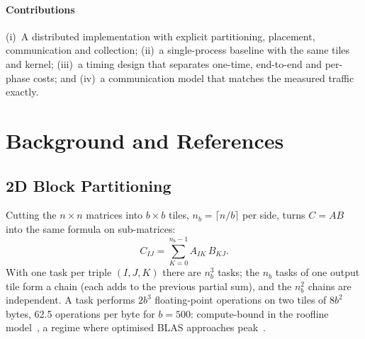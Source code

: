 \documentclass[conference,a4paper]{IEEEtran}
\begin{document}
\paragraph{Contributions} (i)~A distributed implementation with explicit
partitioning, placement, communication and collection; (ii)~a single-process
baseline with the same tiles and kernel; (iii)~a timing design that separates
one-time, end-to-end and per-phase costs; and (iv)~a communication model that
matches the measured traffic exactly.

\section{Background and References}
\label{sec:background}

\subsection{2D Block Partitioning}
Cutting the $n \times n$ matrices into $b \times b$ tiles, $n_b = \lceil n/b
\rceil$ per side, turns $C = AB$ into the same formula on sub-matrices:
\begin{equation}
  C_{IJ} = \sum_{K=0}^{n_b-1} A_{IK}\, B_{KJ}.
  \label{eq:blocks}
\end{equation}
With one task per triple $(I, J, K)$ there are $n_b^3$ tasks; the $n_b$ tasks
of one output tile form a chain (each adds to the previous partial sum), and
the $n_b^2$ chains are independent. A task performs $2b^3$ floating-point
operations on two tiles of $8b^2$ bytes, 62.5 operations per byte for
$b = 500$: compute-bound in the roofline model~\cite{williams2009}, a regime
where optimised BLAS approaches peak~\cite{goto2008}.
\end{document}
